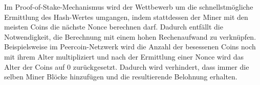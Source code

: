 Im Proof-of-Stake-Mechanismus wird der Wettbewerb um die schnellstmögliche Ermittlung des Hash-Wertes umgangen, indem stattdessen der Miner mit den meisten Coins die nächste Nonce berechnen darf. Dadurch entfällt die Notwendigkeit, die Berechnung mit einem hohen Rechenaufwand zu verknüpfen. Beispielsweise im Peercoin-Netzwerk wird die Anzahl der besessenen Coins noch mit ihrem Alter multipliziert und nach der Ermittlung einer Nonce wird das Alter der Coins auf 0 zurückgesetzt. Dadurch wird verhindert, dass immer die selben Miner Blöcke hinzufügen und die resultierende Belohnung erhalten.